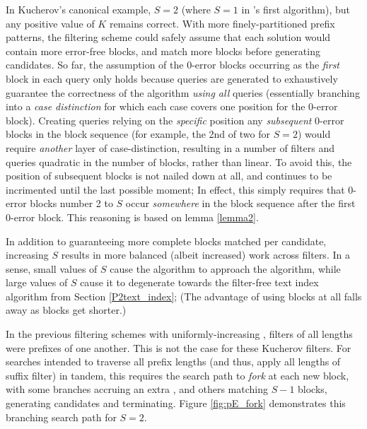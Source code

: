 {In Kucherov’s canonical example, $S=2$ (where $S=1$ in \vali{}’s first algorithm), but any positive value of $K$ remains correct. With more finely-partitioned prefix patterns, the \gls{filtering scheme} could safely assume that each \gls{solution} would contain more \gls{error}-free blocks, and match more blocks before generating \glspl{candidate}. So far, the assumption of the 0-error blocks occurring as the \textit{first} block in each query only holds because queries are generated to exhaustively guarantee the correctness of the algorithm \textit{using all} queries (essentially branching into a \textit{case distinction} for which each case covers one position for the 0-error block). Creating queries relying on the \textit{specific} position any \textit{subsequent} 0-error blocks in the \gls{block sequence} (for example, the 2nd of two for $S=2$) would require \textit{another} layer of case-distinction, resulting in a number of filters and queries quadratic in the number of blocks, rather than linear. To avoid this, the position of subsequent blocks is not nailed down at all, and  continues to be incrimented until the last possible moment; In effect, this simply requires that 0-error blocks number 2 to $S$ occur \textit{somewhere} in the block sequence after the first 0-error block. This reasoning is based on lemma \ref{lemma2}.

In addition to guaranteeing more complete blocks matched per candidate, increasing $S$ results in more balanced (albeit increased) work across filters. In a sense, small values of $S$ cause the algorithm to approach the \kark{} algorithm, while large values of $S$ cause it to degenerate towards the filter-free \gls{text index} algorithm from Section \ref{P2text_index}; (The advantage of using blocks at all falls away as blocks get shorter.)
 
In the previous filtering schemes with uniformly-increasing , \glspl{filter} of all lengths were prefixes of one another. This is not the case for these Kucherov filters. For searches intended to traverse all prefix lengths (and thus, apply all lengths of \gls{suffix filter}) in tandem, this requires the search path to \textit{fork} at each new block, with some branches accruing an extra , and others matching $S-1$ blocks, generating candidates and terminating. Figure \ref{fig:pE_fork} demonstrates this branching search path for $S = 2$. 


}
